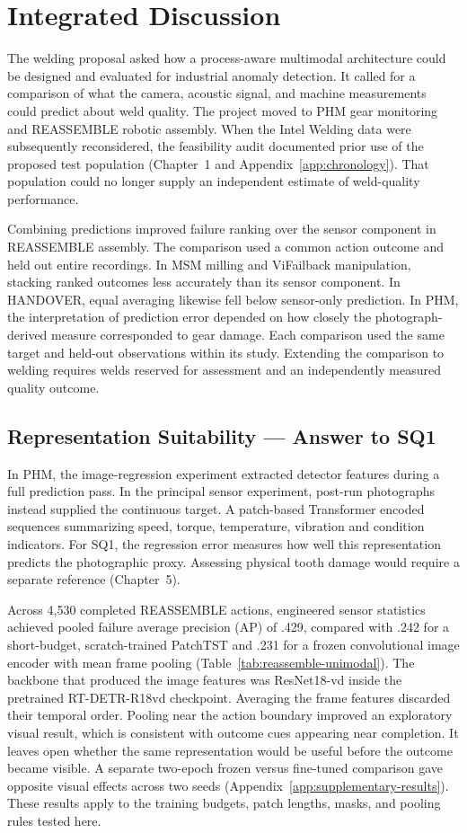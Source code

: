 \chapter{Integrated Discussion}
\label{ch:discussion}

The welding proposal asked how a process-aware multimodal architecture could be designed and evaluated for industrial anomaly detection. It called for a comparison of what the camera, acoustic signal, and machine measurements could predict about weld quality. The project moved to PHM gear monitoring and REASSEMBLE robotic assembly. When the Intel Welding data were subsequently reconsidered, the feasibility audit documented prior use of the proposed test population (Chapter~1 and Appendix~\ref{app:chronology}). That population could no longer supply an independent estimate of weld-quality performance.

Combining predictions improved failure ranking over the sensor component in REASSEMBLE assembly. The comparison used a common action outcome and held out entire recordings. In MSM milling and ViFailback manipulation, stacking ranked outcomes less accurately than its sensor component. In HANDOVER, equal averaging likewise fell below sensor-only prediction. In PHM, the interpretation of prediction error depended on how closely the photograph-derived measure corresponded to gear damage. Each comparison used the same target and held-out observations within its study. Extending the comparison to welding requires welds reserved for assessment and an independently measured quality outcome.

\section{Representation Suitability --- Answer to SQ1}
In PHM, the image-regression experiment extracted detector features during a full prediction pass. In the principal sensor experiment, post-run photographs instead supplied the continuous target. A patch-based Transformer encoded sequences summarizing speed, torque, temperature, vibration and condition indicators. For SQ1, the regression error measures how well this representation predicts the photographic proxy. Assessing physical tooth damage would require a separate reference (Chapter~5).

Across 4,530 completed REASSEMBLE actions, engineered sensor statistics achieved pooled failure average precision (AP) of .429, compared with .242 for a short-budget, scratch-trained PatchTST and .231 for a frozen convolutional image encoder with mean frame pooling (Table~\ref{tab:reassemble-unimodal}). The backbone that produced the image features was ResNet18-vd inside the pretrained RT-DETR-R18vd checkpoint. Averaging the frame features discarded their temporal order. Pooling near the action boundary improved an exploratory visual result, which is consistent with outcome cues appearing near completion. It leaves open whether the same representation would be useful before the outcome became visible. A separate two-epoch frozen versus fine-tuned comparison gave opposite visual effects across two seeds (Appendix~\ref{app:supplementary-results}). These results apply to the training budgets, patch lengths, masks, and pooling rules tested here.

